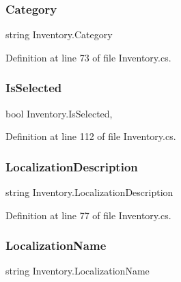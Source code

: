 \subsubsection{\texorpdfstring{Category}{Category}}
{\footnotesize\ttfamily string Inventory.\+Category\hspace{0.3cm}{\ttfamily [get]}}



Definition at line 73 of file Inventory.\+cs.

\mbox{\label{class_inventory_a65c2afad578199c93e073d7a0c7c29ae}} 
\subsubsection{\texorpdfstring{Is\+Selected}{IsSelected}}
{\footnotesize\ttfamily bool Inventory.\+Is\+Selected\hspace{0.3cm}{\ttfamily [get]}, {\ttfamily [set]}}



Definition at line 112 of file Inventory.\+cs.

\mbox{\label{class_inventory_aee8e3400bd94b3bb09417a778af3c354}} 
\subsubsection{\texorpdfstring{Localization\+Description}{LocalizationDescription}}
{\footnotesize\ttfamily string Inventory.\+Localization\+Description\hspace{0.3cm}{\ttfamily [get]}}



Definition at line 77 of file Inventory.\+cs.

\mbox{\label{class_inventory_ad99ffac71e181c38c31a48131b76e73d}} 
\subsubsection{\texorpdfstring{Localization\+Name}{LocalizationName}}
{\footnotesize\ttfamily string Inventory.\+Localization\+Name\hspace{0.3cm}{\ttfamily [get]}}



